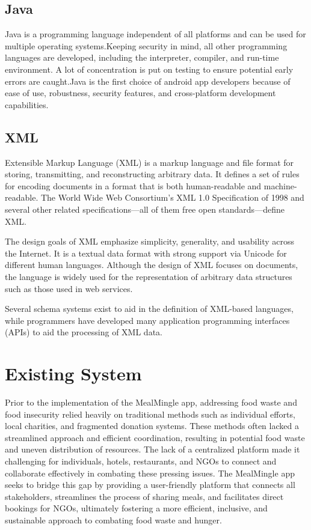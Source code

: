 \subsection{Java}
Java is a programming language independent of all platforms and can be used for multiple operating systems.Keeping security in mind, all other programming languages are developed, including the interpreter, compiler, and run-time environment. A lot of concentration is put on testing to ensure potential early errors are caught.Java is the first choice of android app developers because of ease of use, robustness, security features, and cross-platform development capabilities.
\subsection{XML}
Extensible Markup Language (XML) is a markup language and file format for storing, transmitting, and reconstructing arbitrary data. It defines a set of rules for encoding documents in a format that is both human-readable and machine-readable. The World Wide Web Consortium's XML 1.0 Specification of 1998 and several other related specifications—all of them free open standards—define XML.

The design goals of XML emphasize simplicity, generality, and usability across the Internet. It is a textual data format with strong support via Unicode for different human languages. Although the design of XML focuses on documents, the language is widely used for the representation of arbitrary data structures such as those used in web services.

Several schema systems exist to aid in the definition of XML-based languages, while programmers have developed many application programming interfaces (APIs) to aid the processing of XML data. 

\section{ Existing System}
Prior to the implementation of the MealMingle app, addressing food waste and food insecurity relied heavily on traditional methods such as individual efforts, local charities, and fragmented donation systems. These methods often lacked a streamlined approach and efficient coordination, resulting in potential food waste and uneven distribution of resources. The lack of a centralized platform made it challenging for individuals, hotels, restaurants, and NGOs to connect and collaborate effectively in combating these pressing issues. The MealMingle app seeks to bridge this gap by providing a user-friendly platform that connects all stakeholders, streamlines the process of sharing meals, and facilitates direct bookings for NGOs, ultimately fostering a more efficient, inclusive, and sustainable approach to combating food waste and hunger.
